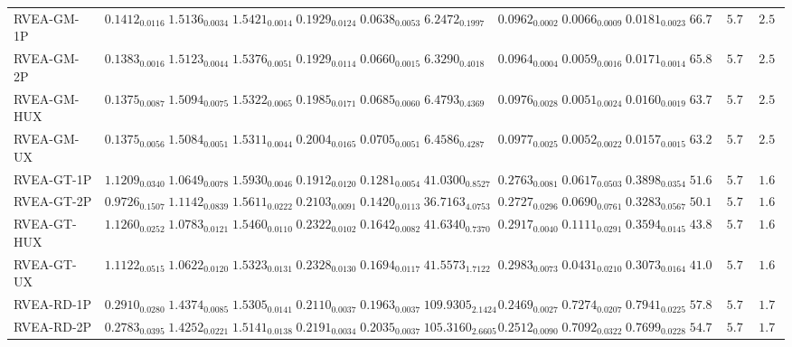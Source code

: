 \documentclass[11pt,a4paper]{article}
\begin{document}
\begin{table}[H]
{\begin{tabular}{lcccccccccccc}
RVEA-GM-1P & $0.1412_{0.0116}$ & $1.5136_{0.0034}$ & $1.5421_{0.0014}$ & $0.1929_{0.0124}$ & $0.0638_{0.0053}$ & $6.2472_{0.1997}$ & $0.0962_{0.0002}$ & $0.0066_{0.0009}$ & $\mathbf{0.0181}_{0.0023}$ & $66.78$ & $5.78$ & $2.56$ \\
RVEA-GM-2P & $0.1383_{0.0016}$ & $1.5123_{0.0044}$ & $1.5376_{0.0051}$ & $0.1929_{0.0114}$ & $0.0660_{0.0015}$ & $6.3290_{0.4018}$ & $0.0964_{0.0004}$ & $0.0059_{0.0016}$ & $\mathbf{0.0171}_{0.0014}$ & $65.89$ & $5.78$ & $2.56$ \\
RVEA-GM-HUX & $0.1375_{0.0087}$ & $1.5094_{0.0075}$ & $1.5322_{0.0065}$ & $0.1985_{0.0171}$ & $0.0685_{0.0060}$ & $6.4793_{0.4369}$ & $0.0976_{0.0028}$ & $0.0051_{0.0024}$ & $\mathbf{0.0160}_{0.0019}$ & $63.78$ & $5.78$ & $2.56$ \\
RVEA-GM-UX & $0.1375_{0.0056}$ & $1.5084_{0.0051}$ & $1.5311_{0.0044}$ & $0.2004_{0.0165}$ & $0.0705_{0.0051}$ & $6.4586_{0.4287}$ & $0.0977_{0.0025}$ & $0.0052_{0.0022}$ & $\mathbf{0.0157}_{0.0015}$ & $63.22$ & $5.78$ & $2.56$ \\
RVEA-GT-1P & $1.1209_{0.0340}$ & $1.0649_{0.0078}$ & $1.5930_{0.0046}$ & $0.1912_{0.0120}$ & $0.1281_{0.0054}$ & $41.0300_{0.8527}$ & $0.2763_{0.0081}$ & $0.0617_{0.0503}$ & $0.3898_{0.0354}$ & $51.67$ & $5.78$ & $\mathbf{1.67}$ \\
RVEA-GT-2P & $0.9726_{0.1507}$ & $1.1142_{0.0839}$ & $1.5611_{0.0222}$ & $0.2103_{0.0091}$ & $0.1420_{0.0113}$ & $36.7163_{4.0753}$ & $0.2727_{0.0296}$ & $0.0690_{0.0761}$ & $0.3283_{0.0567}$ & $50.11$ & $5.78$ & $\mathbf{1.67}$ \\
RVEA-GT-HUX & $1.1260_{0.0252}$ & $1.0783_{0.0121}$ & $1.5460_{0.0110}$ & $0.2322_{0.0102}$ & $0.1642_{0.0082}$ & $41.6340_{0.7370}$ & $0.2917_{0.0040}$ & $0.1111_{0.0291}$ & $0.3594_{0.0145}$ & $43.89$ & $5.78$ & $\mathbf{1.67}$ \\
RVEA-GT-UX & $1.1122_{0.0515}$ & $1.0622_{0.0120}$ & $1.5323_{0.0131}$ & $0.2328_{0.0130}$ & $0.1694_{0.0117}$ & $41.5573_{1.7122}$ & $0.2983_{0.0073}$ & $0.0431_{0.0210}$ & $0.3073_{0.0164}$ & $41.00$ & $5.78$ & $\mathbf{1.67}$ \\
RVEA-RD-1P & $0.2910_{0.0280}$ & $1.4374_{0.0085}$ & $1.5305_{0.0141}$ & $0.2110_{0.0037}$ & $0.1963_{0.0037}$ & $109.9305_{2.1424}$ & $0.2469_{0.0027}$ & $0.7274_{0.0207}$ & $0.7941_{0.0225}$ & $57.89$ & $5.78$ & $1.78$ \\
RVEA-RD-2P & $0.2783_{0.0395}$ & $1.4252_{0.0221}$ & $1.5141_{0.0138}$ & $0.2191_{0.0034}$ & $0.2035_{0.0037}$ & $105.3160_{2.6605}$ & $0.2512_{0.0090}$ & $0.7092_{0.0322}$ & $0.7699_{0.0228}$ & $54.78$ & $5.78$ & $1.78$ \\

\end{tabular}}
\end{table}
\end{document}
